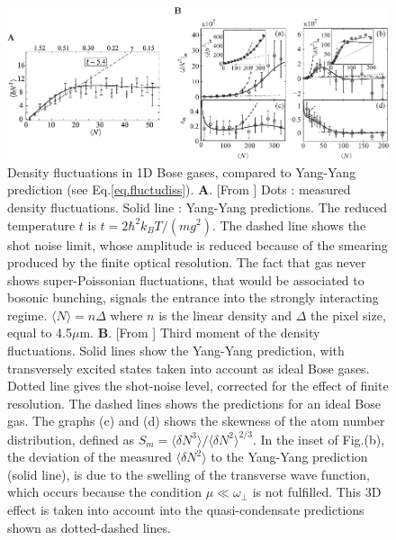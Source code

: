 \documentclass[onecolumn,amsfonts,showpacs,superscriptaddress]{revtex4-1}
\begin{document}
\begin{figure}
    \centering
    \includegraphics{figures/figDensityFluctu_cropped.pdf}
    \caption{Density fluctuations in 1D Bose gases, compared to Yang-Yang prediction (see Eq.\eqref{eq.fluctudiss}). {\bf A}. [From \cite{jacqmin_sub-poissonian_2011}] Dots : measured density fluctuations. Solid line :  Yang-Yang predictions. The reduced temperature $t$ is $t=2\hbar^2 k_B T /(mg^2)$. The dashed line shows the shot noise limit, whose amplitude is reduced because 
    of the smearing produced by the finite optical resolution. The fact that gas never shows super-Poissonian fluctuations, that would be associated to bosonic bunching, signals the entrance into the strongly interacting regime. $\langle N \rangle = n\Delta$ where $n$ is the linear density and $\Delta$ the pixel size, equal to 4.5$\mu$m.  
    {\bf B}. [From \cite{armijo_probing_2010}] Third moment of the density fluctuations. Solid lines show the Yang-Yang prediction, with transversely excited states taken into account as ideal Bose gases. Dotted line gives the shot-noise level, corrected for the effect of finite resolution. The dashed lines shows the predictions for an ideal Bose gas. The graphs (c) and (d) shows the skewness of the atom number distribution, defined as $S_m= \langle \delta N^3\rangle/\langle \delta N^2\rangle^{2/3}$. 
    In the inset of Fig.(b), the deviation of the measured $\langle \delta N^2\rangle$ to the Yang-Yang prediction (solid line), is due to the swelling of the transverse wave function, which occurs because the condition $\mu \ll \omega_\perp$ is not fulfilled. This 3D effect is taken into account into the quasi-condensate predictions shown as dotted-dashed lines. }
    \label{fig:densityfluctu}
\end{figure}
\end{document}
